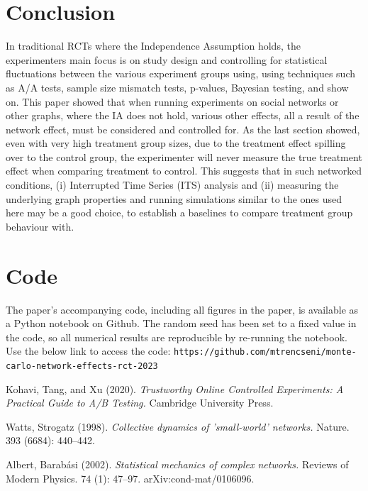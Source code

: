 \documentclass[final,5p,times,twocolumn,authoryear]{elsarticle}
\begin{document}
\section{Conclusion}

In traditional RCTs where the Independence Assumption holds, the experimenters main focus is on study design and controlling for statistical fluctuations between the various experiment groups using, using techniques such as A/A tests, sample size mismatch tests, p-values, Bayesian testing, and show on. This paper showed that when running experiments on social networks or other graphs, where the IA does not hold, various other effects, all a result of the network effect, must be considered and controlled for. As the last section showed, even with very high treatment group sizes, due to the treatment effect spilling over to the control group, the experimenter will never measure the true treatment effect when comparing treatment to control. This suggests that in such networked conditions, (i) Interrupted Time Series (ITS) analysis and (ii) measuring the underlying graph properties and running simulations similar to the ones used here may be a good choice, to establish a baselines to compare treatment group behaviour with.

\section{Code}

The paper's accompanying code, including all figures in the paper, is available as a Python notebook on Github. The random seed has been set to a fixed value in the code, so all numerical results are reproducible by re-running the notebook. Use the below link to access the code:
\texttt{{\scriptsize https://github.com/mtrencseni/monte-carlo-network-effects-rct-2023 }}

 


\begin{thebibliography}{00}


 Kohavi, Tang, and Xu (2020). \textit{Trustworthy Online Controlled Experiments: A Practical Guide to A/B Testing.} Cambridge University Press.

 Watts, Strogatz (1998). \textit{Collective dynamics of 'small-world' networks.} Nature. 393 (6684): 440–442.

 Albert, Barabási (2002). \textit{Statistical mechanics of complex networks.} Reviews of Modern Physics. 74 (1): 47–97. arXiv:cond-mat/0106096.



\end{thebibliography}
\end{document}
